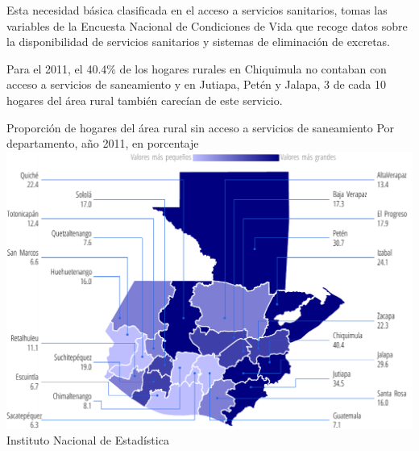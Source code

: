                     {%
Esta necesidad básica clasificada en el acceso a servicios sanitarios, tomas las variables de la Encuesta Nacional de Condiciones de Vida que recoge datos sobre la disponibilidad de servicios sanitarios y sistemas de eliminación de excretas.

Para el 2011, el 40.4\% de los hogares rurales en Chiquimula no contaban con acceso a servicios de saneamiento y en Jutiapa, Petén y Jalapa, 3 de cada 10 hogares del área rural también carecían de este servicio.   }%
                    {%
                    	Proporción de hogares del área rural sin acceso a servicios de saneamiento }
                    {%
                    	Por departamento, año 2011, en porcentaje} %
                    {%
                    	\includegraphics[width=52\cuadri]{graficas/1_15.pdf}}%
                    {%
                    	Instituto Nacional de Estadística} %

                  
                     

